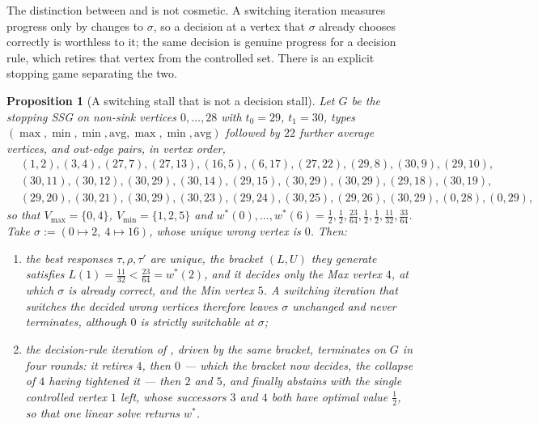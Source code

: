 \documentclass[11pt]{article}
\theoremstyle{plain}
\newtheorem{proposition}[theorem]{Proposition}
\theoremstyle{definition}
\newcommand{\Vmax}{V_{\max}}
\newcommand{\Vmin}{V_{\min}}
\begin{document}
\medskip

The distinction between  and  is
not cosmetic. A switching iteration measures progress only by changes to
$\sigma$, so a decision at a vertex that $\sigma$ already chooses
correctly is worthless to it; the same decision is genuine progress for a
decision rule, which retires that vertex from the controlled set. There
is an explicit stopping game separating the two.

\begin{proposition}[A switching stall that is not a decision stall]\label{prop:pdc-separation}
Let $G$ be the stopping SSG on non-sink vertices $0,\dots,28$ with
$t_0=29$, $t_1=30$, types
$(\max,\min,\min,\mathrm{avg},\max,\min,\mathrm{avg})$ followed by $22$
further average vertices, and out-edge pairs, in vertex order,
\[
\begin{aligned}
&(1,2),(3,4),(27,7),(27,13),(16,5),(6,17),(27,22),(29,8),(30,9),(29,10),\\
&(30,11),(30,12),(30,29),(30,14),(29,15),(30,29),(30,29),(29,18),(30,19),\\
&(29,20),(30,21),(30,29),(30,23),(29,24),(30,25),(29,26),(30,29),(0,28),(0,29),
\end{aligned}
\]
so that $\Vmax=\{0,4\}$, $\Vmin=\{1,2,5\}$ and
$w^\ast(0),\dots,w^\ast(6)=\tfrac12,\tfrac12,\tfrac{23}{64},\tfrac12,\tfrac12,\tfrac{11}{32},\tfrac{33}{64}$.
Take $\sigma:=(0\mapsto2,\ 4\mapsto16)$, whose unique wrong vertex is $0$.
Then:
\begin{enumerate}[label=(\alph*),leftmargin=2.2em]
\item the best responses $\tau,\rho,\tau'$ are unique, the bracket
  $(L,U)$ they generate satisfies $L(1)=\tfrac{11}{32}<\tfrac{23}{64}=w^\ast(2)$,
  and it decides only the Max vertex $4$, at which $\sigma$ is already
  correct, and the Min vertex $5$. A switching iteration that switches the decided wrong
  vertices therefore leaves $\sigma$ unchanged and never terminates,
  although $0$ is strictly switchable at $\sigma$;
\item the decision-rule iteration of , driven by
  the \emph{same} bracket, terminates on $G$ in four rounds: it retires
  $4$, then $0$ --- which the bracket now decides, the collapse of $4$
  having tightened it --- then $2$ and $5$, and finally abstains with the
  single controlled vertex $1$ left, whose successors $3$ and $4$ both
  have optimal value $\tfrac12$, so that one linear solve returns
  $w^\ast$.
\end{enumerate}
\end{proposition}
\end{document}
